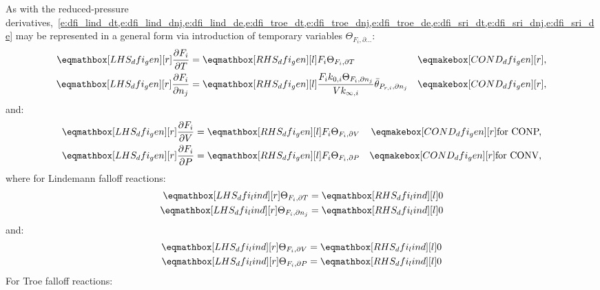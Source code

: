 \documentclass[12pt]{article}
\newcommand{\conp}{CONP}
\newcommand{\conv}{CONV}
\newcommand{\dconp}{\ifmmode\text{for \conp,}\else for \conp,\fi}
\newcommand{\dconv}{\ifmmode\text{for \conv,}\else for \conv,\fi}
\begin{document}
As with the reduced-pressure derivatives,~\cref{e:dfi_lind_dt,e:dfi_lind_dnj,e:dfi_lind_de,e:dfi_troe_dt,e:dfi_troe_dnj,e:dfi_troe_de,e:dfi_sri_dt,e:dfi_sri_dnj,e:dfi_sri_de} may be represented in a general form via introduction of temporary variables $\Theta_{F_i, \partial \ldots}$:
\begin{align}
\lhs{dfi_gen}{\frac{\partial F_{i} }{\partial T }} &= \rhs{dfi_gen}{F_{i} \Theta_{F_i, \partial T}} & \cond{dfi_gen}{,} \\
\lhs{dfi_gen}{\frac{\partial F_{i} }{\partial {n_j}}} &= \rhs{dfi_gen}{\frac{F_{i} k_{0, i} \Theta_{F_i, \partial n_j}}{V k_{\infty, i}} \bar{\theta}_{P_{r, i}, \partial n_j}} & \cond{dfi_gen}{,}
\end{align}
and:
\begin{subequations}
 \begin{align}
  \lhs{dfi_gen}{\frac{\partial F_{i} }{\partial V }} &= \rhs{dfi_gen}{F_{i} \Theta_{F_i, \partial V}} & \cond{dfi_gen}{\dconp} \\
  \lhs{dfi_gen}{\frac{\partial F_{i} }{\partial P }} &= \rhs{dfi_gen}{F_{i} \Theta_{F_i, \partial P}} & \cond{dfi_gen}{\dconv}
 \end{align}
\end{subequations}
where for Lindemann falloff reactions:
\begin{align}
\label{e:dfi_lind_dt_prod}
\lhs{dfi_lind}{\Theta_{F_i, \partial T}} &= \rhs{dfi_lind}{0} \\
\label{e:dfi_lind_dnj_prod}
\lhs{dfi_lind}{\Theta_{F_i, \partial n_j}} &= \rhs{dfi_lind}{0}
\end{align}
and:
\begin{subequations}
 \label{e:dfi_lind_de_prod}
 \begin{align}
  \lhs{dfi_lind}{\Theta_{F_i, \partial V}} &= \rhs{dfi_lind}{0} \\
  \lhs{dfi_lind}{\Theta_{F_i, \partial P}} &= \rhs{dfi_lind}{0}
 \end{align}
\end{subequations}
For Troe falloff reactions:
\end{document}
